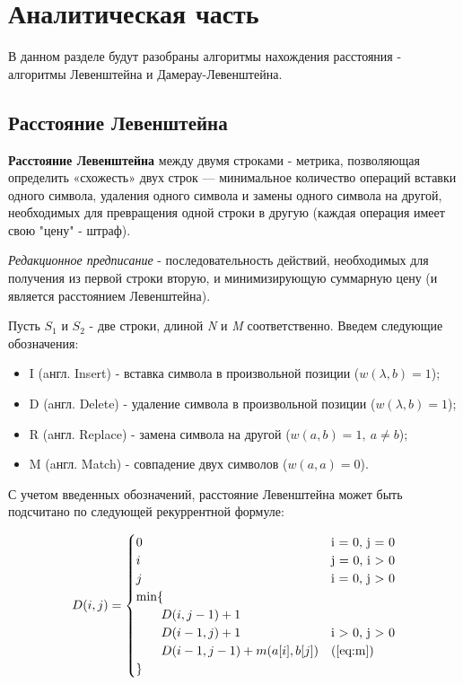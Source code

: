 \chapter{Аналитическая часть}

В данном разделе будут разобраны алгоритмы нахождения расстояния - алгоритмы Левенштейна и Дамерау-Левенштейна.

\section{Расстояние Левенштейна}

\textbf{Расстояние Левенштейна} \cite{levenshtein} между двумя строками - метрика, позволяющая определить «схожесть» двух строк — минимальное количество операций вставки одного символа, удаления одного символа и замены одного символа на другой, необходимых для превращения одной строки в другую (каждая операция имеет свою "цену" - штраф). \newline


\textit{Редакционное предписание} - последовательность действий, необходимых для получения из первой строки вторую, и минимизирующую суммарную цену (и является расстоянием Левенштейна).\newline


Пусть $S_{1}$ и $S_{2}$ - две строки, длиной \textit{N} и \textit{M} соответственно. Введем следующие обозначения:
\begin{itemize}
        \item I (aнгл. Insert) - вставка символа в произвольной позиции ($w(\lambda,b)=1$);
        \item D (aнгл. Delete) - удаление символа в произвольной позиции ($w(\lambda,b)=1$);
        \item R (aнгл. Replace) - замена символа на другой ($w(a,b)=1, \medspace a \neq b$);
        \item M (aнгл. Match) - совпадение двух символов ($w(a,a)=0$). \newline
\end{itemize} 


С учетом введенных обозначений, расстояние Левенштейна может быть подсчитано по следующей рекуррентной формуле:


\begin{equation}
	\label{eq:D}
	D(i, j) = \begin{cases}
		
		0 &\text{i = 0, j = 0}\\
		i &\text{j = 0, i > 0}\\
		j &\text{i = 0, j > 0}\\
		\min \lbrace \\
		\qquad D(i, j-1) + 1\\
		\qquad D(i-1, j) + 1 &\text{i > 0, j > 0}\\
		\qquad D(i-1, j-1) + m(a[i], b[j]) &\text(\ref{eq:m})\\
		\rbrace
	\end{cases}
\end{equation}


